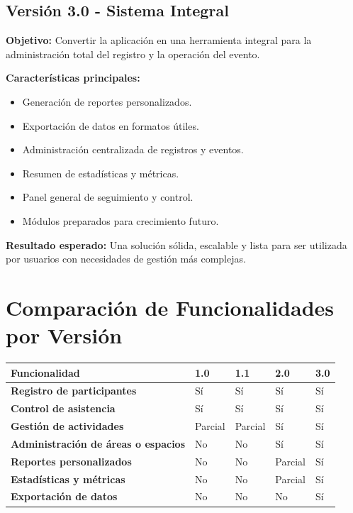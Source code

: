 \documentclass[11pt,a4paper]{article}
\begin{document}
\subsection{Versión 3.0 - Sistema Integral}
\textbf{Objetivo:}\newline
Convertir la aplicación en una herramienta integral para la administración total del registro y la operación del evento.

\textbf{Características principales:}
\begin{itemize}[leftmargin=1.5em]
    \item Generación de reportes personalizados.
    \item Exportación de datos en formatos útiles.
    \item Administración centralizada de registros y eventos.
    \item Resumen de estadísticas y métricas.
    \item Panel general de seguimiento y control.
    \item Módulos preparados para crecimiento futuro.
\end{itemize}

\textbf{Resultado esperado:}\newline
Una solución sólida, escalable y lista para ser utilizada por usuarios con necesidades de gestión más complejas.

\section{Comparación de Funcionalidades por Versión}
\begin{table}[H]
\centering
\renewcommand{\arraystretch}{1.4}
\begin{tabularx}{\textwidth}{|>{\bfseries}p{}|X|X|X|X|}
\hline
\rowcolor{lightblue}
\textcolor{navyblue}{\textbf{Funcionalidad}} & \textcolor{navyblue}{\textbf{1.0}} & \textcolor{navyblue}{\textbf{1.1}} & \textcolor{navyblue}{\textbf{2.0}} & \textcolor{navyblue}{\textbf{3.0}} \\
\hline
Registro de participantes & Sí & Sí & Sí & Sí \\
\hline
Control de asistencia & Sí & Sí & Sí & Sí \\
\hline
Gestión de actividades & Parcial & Parcial & Sí & Sí \\
\hline
Administración de áreas o espacios & No & No & Sí & Sí \\
\hline
Reportes personalizados & No & No & Parcial & Sí \\
\hline
Estadísticas y métricas & No & No & Parcial & Sí \\
\hline
Exportación de datos & No & No & No & Sí \\
\hline
\end{tabularx}
\end{table}
\end{document}
